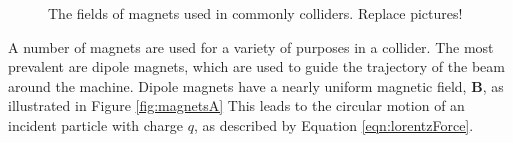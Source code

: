 
\begin{figure}[h!]
\captionsetup[subfigure]{position=b}
\centering
{}
\caption{The fields of magnets used in commonly colliders. {\color{red} Replace pictures!}}
\label{fig:magnets}
\end{figure}

A number of magnets are used for a variety of purposes in a collider.
The most prevalent are dipole magnets, which are used to guide the trajectory of the beam around the machine.
Dipole magnets have a nearly uniform magnetic field, $\pmb B$, as illustrated in Figure \ref{fig:magnetsA}
This leads to the circular motion of an incident particle with charge $q$, as described by Equation \ref{eqn:lorentzForce}.

